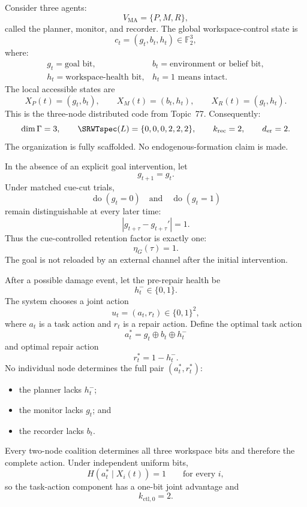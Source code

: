 
Consider three agents:
\[
V_{\mathrm{MA}}=\{P,M,R\},
\]
called the planner, monitor, and recorder. The global workspace-control state
is
\[
c_t=(g_t,b_t,h_t)\in\mathbb F_2^3,
\]
where:
\[
\begin{array}{ll}
g_t=\text{goal bit},
&b_t=\text{environment or belief bit},\\
h_t=\text{workspace-health bit},
&h_t=1\text{ means intact}.
\end{array}
\]
The local accessible states are
\[
X_P(t)=(g_t,b_t),
\qquad
X_M(t)=(b_t,h_t),
\qquad
X_R(t)=(g_t,h_t).
\]
This is the three-node distributed code from Topic~77. Consequently:
\[
\dim\Gamma=3,
\qquad
\SRWTspec(L)=\{0,0,0,2,2,2\},
\qquad
k_{\mathrm{rec}}=2,
\qquad
d_{\mathrm{er}}=2.
\]
The organization is fully scaffolded. No endogenous-formation claim is made.


In the absence of an explicit goal intervention, let
\[
g_{t+1}=g_t.
\]
Under matched cue-cut trials,
\[
\operatorname{do}(g_t=0)
\quad\text{and}\quad
\operatorname{do}(g_t=1)
\]
remain distinguishable at every later time:
\[
|g_{t+\tau}-g_{t+\tau}'|=1.
\]
Thus the cue-controlled retention factor is exactly one:
\[
\eta_G(\tau)=1.
\]
The goal is not reloaded by an external channel after the initial intervention.


After a possible damage event, let the pre-repair health be
\[
h_t^-\in\{0,1\}.
\]
The system chooses a joint action
\[
u_t=(a_t,r_t)\in\{0,1\}^2,
\]
where \(a_t\) is a task action and \(r_t\) is a repair action. Define the
optimal task action
\[
a_t^*=g_t\oplus b_t\oplus h_t^-
\]
and optimal repair action
\[
r_t^*=1-h_t^-.
\]
No individual node determines the full pair \((a_t^*,r_t^*)\):
\begin{itemize}
\item the planner lacks \(h_t^-\);
\item the monitor lacks \(g_t\); and
\item the recorder lacks \(b_t\).
\end{itemize}
Every two-node coalition determines all three workspace bits and therefore the
complete action. Under independent uniform bits,
\[
H(a_t^*\mid X_i(t))=1
\qquad\text{for every }i,
\]
so the task-action component has a one-bit joint advantage and
\[
k_{\mathrm{ctl},0}=2.
\]

